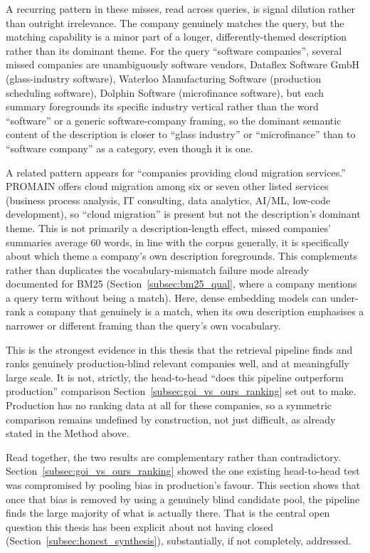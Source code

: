 \documentclass[a4paper,oneside,bibliography=totoc]{scrbook}
\begin{document}
A recurring pattern in these misses, read across queries, is signal dilution rather than outright irrelevance. The company genuinely matches the query, but the matching capability is a minor part of a longer, differently-themed description rather than its dominant theme. For the query ``software companies'', several missed companies are unambiguously software vendors, Dataflex Software GmbH (glass-industry software), Waterloo Manufacturing Software (production scheduling software), Dolphin Software (microfinance software), but each summary foregrounds its specific industry vertical rather than the word ``software'' or a generic software-company framing, so the dominant semantic content of the description is closer to ``glass industry'' or ``microfinance'' than to ``software company'' as a category, even though it is one.

A related pattern appears for ``companies providing cloud migration services.'' PROMAIN offers cloud migration among six or seven other listed services (business process analysis, IT consulting, data analytics, AI/ML, low-code development), so ``cloud migration'' is present but not the description's dominant theme. This is not primarily a description-length effect, missed companies' summaries average 60 words, in line with the corpus generally, it is specifically about which theme a company's own description foregrounds. This complements rather than duplicates the vocabulary-mismatch failure mode already documented for BM25 (Section~\ref{subsec:bm25_qual}, where a company mentions a query term without being a match). Here, dense embedding models can under-rank a company that genuinely is a match, when its own description emphasises a narrower or different framing than the query's own vocabulary.

This is the strongest evidence in this thesis that the retrieval pipeline finds and ranks genuinely production-blind relevant companies well, and at meaningfully large scale. It is not, strictly, the head-to-head ``does this pipeline outperform production'' comparison Section~\ref{subsec:goi_vs_ours_ranking} set out to make. Production has no ranking data at all for these companies, so a symmetric comparison remains undefined by construction, not just difficult, as already stated in the Method above.

Read together, the two results are complementary rather than contradictory. Section~\ref{subsec:goi_vs_ours_ranking} showed the one existing head-to-head test was compromised by pooling bias in production's favour. This section shows that once that bias is removed by using a genuinely blind candidate pool, the pipeline finds the large majority of what is actually there. That is the central open question this thesis has been explicit about not having closed (Section~\ref{subsec:honest_synthesis}), substantially, if not completely, addressed.
\end{document}
